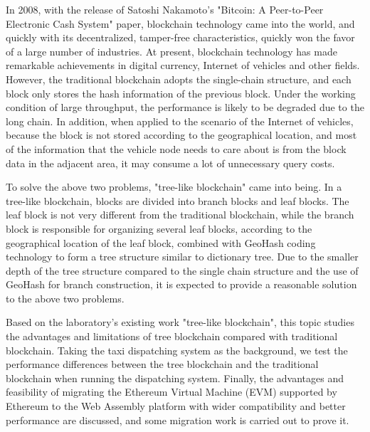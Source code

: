 \begin{abstractEn}
In 2008, with the release of Satoshi Nakamoto's "Bitcoin: A Peer-to-Peer Electronic Cash System" paper, blockchain technology came into the world, and quickly with its decentralized, tamper-free characteristics, quickly won the favor of a large number of industries. At present, blockchain technology has made remarkable achievements in digital currency, Internet of vehicles and other fields. However, the traditional blockchain adopts the single-chain structure, and each block only stores the hash information of the previous block. Under the working condition of large throughput, the performance is likely to be degraded due to the long chain. In addition, when applied to the scenario of the Internet of vehicles, because the block is not stored according to the geographical location, and most of the information that the vehicle node needs to care about is from the block data in the adjacent area, it may consume a lot of unnecessary query costs.

To solve the above two problems, "tree-like blockchain" came into being. In a tree-like blockchain, blocks are divided into branch blocks and leaf blocks. The leaf block is not very different from the traditional blockchain, while the branch block is responsible for organizing several leaf blocks, according to the geographical location of the leaf block, combined with GeoHash coding technology to form a tree structure similar to dictionary tree. Due to the smaller depth of the tree structure compared to the single chain structure and the use of GeoHash for branch construction, it is expected to provide a reasonable solution to the above two problems.

Based on the laboratory's existing work "tree-like blockchain", this topic studies the advantages and limitations of tree blockchain compared with traditional blockchain. Taking the taxi dispatching system as the background, we test the performance differences between the tree blockchain and the traditional blockchain when running the dispatching system. Finally, the advantages and feasibility of migrating the Ethereum Virtual Machine (EVM) supported by Ethereum to the Web Assembly platform with wider compatibility and better performance are discussed, and some migration work is carried out to prove it.

\end{abstractEn}
